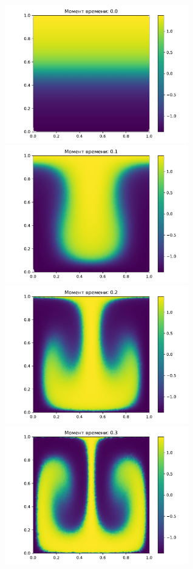         \begin{figure}[H]
            \centering
            \includegraphics[width=8cm]{pictures/pr0.pdf}
            \includegraphics[width=8cm]{pictures/pr5.pdf}
            \includegraphics[width=8cm]{pictures/pr10.pdf}
            \includegraphics[width=8cm]{pictures/pr15.pdf}

\end{figure}
